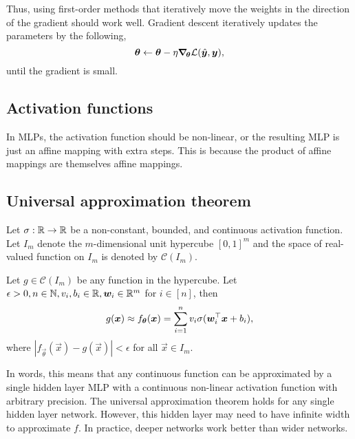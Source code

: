 Thus, using first-order methods that iteratively move the weights in the direction of the gradient
should work well. Gradient descent iteratively updates the parameters by the following, \[
    \bm{\theta} \gets \bm{\theta} - \eta \bm{\nabla}_{\! \bm{\theta}} \mathcal{L}(\hat{\bm{y}},\bm{y}),
\]
until the gradient is small.

\subsection{Activation functions}

In MLPs, the activation function should be non-linear, or the resulting MLP is just an affine
mapping with extra steps. This is because the product of affine mappings are themselves affine
mappings.

\subsection{Universal approximation theorem}

\begin{theorem}
    Let $\sigma: \mathbb{R}\to \mathbb{R}$ be a non-constant, bounded, and continuous activation function.
    Let $I_m$ denote the $m$-dimensional unit hypercube $[0,1]^m$ and the space of real-valued
    function on $I_m$ is denoted by $\mathcal{C}(I_m)$.

    Let $g \in \mathcal{C}(I_m)$ be any function in the hypercube. Let $\epsilon > 0, n\in \mathbb{N},
        v_i,b_i \in \mathbb{R}, \bm{w}_i \in \mathbb{R}^m$ for $i \in [n]$, then \[
        g(\bm{x}) \approx f_{\bm{\theta}}(\bm{x}) = \sum_{i=1}^{n} v_i \sigma(\bm{w}_i^\top \bm{x} + b_i),
    \]
    where $|f_{\vec{\theta}}(\vec{x}) - g(\vec{x})| < \epsilon$ for all $\vec{x}\in I_m$.
\end{theorem}

In words, this means that any continuous function can be approximated by a single hidden layer MLP
with a continuous non-linear activation function with arbitrary precision. The universal
approximation theorem holds for any single hidden layer network. However, this hidden layer may
need to have infinite width to approximate $f$. In practice, deeper networks work better than wider
networks.
